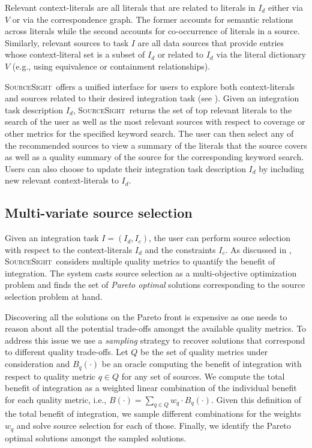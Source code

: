 \documentclass{vldb}
\newcommand\system{\textsc{SourceSight}}
\begin{document}
Relevant context-literals are all literals that are related to literals in $I_d$ either via $V$ or via the correspondence graph. The former accounts for semantic relations across literals while the second accounts for co-occurrence of literals in a source. Similarly, relevant sources to task $I$ are all data sources that provide entries whose context-literal set is a subset of $I_d$ or related to $I_d$ via the literal dictionary $V$ (e.g., using equivalence or containment relationships). 

\system~offers a unified interface for users to explore both context-literals and sources related to their desired integration task (see ). Given an integration task description $I_d$, \system~returns the set of top relevant literals to the search of the user as well as the most relevant sources with respect to coverage or other metrics for the specified keyword search. The user can then select any of the recommended sources to view a summary of the literals that the source covers as well as a quality summary of the source for the corresponding keyword search. Users can also choose to update their integration task description $I_d$ by including new relevant context-literals to $I_d$.

\subsection{Multi-variate source selection}
\label{sec:sourcesel}
Given an integration task $I = (I_d,I_c)$, the user can perform source selection with respect to the context-literals $I_d$ and the constraints $I_c$. As discussed in , \system~considers multiple quality metrics to quantify the benefit of integration. The system casts source selection as a multi-objective optimization problem and finds the set of {\em Pareto optimal} solutions corresponding to the source selection problem at hand. 

Discovering all the solutions on the Pareto front is expensive as one needs to reason about all the potential trade-offs amongst the available quality metrics. To address this issue we use a {\em sampling} strategy to recover solutions that correspond to different quality trade-offs. Let $Q$ be the set of quality metrics under consideration and $B_q(\cdot)$ be an oracle computing the benefit of integration with respect to quality metric $q \in Q$ for any set of sources. We compute the total benefit of integration as a weighted linear combination of the individual benefit for each quality metric, i.e., $B(\cdot) = \sum_{q \in Q} w_q \cdot B_q(\cdot)$. Given this definition of the total benefit of integration, we sample different combinations for the weights $w_q$ and solve source selection for each of those. Finally, we identify the Pareto optimal solutions amongst the sampled solutions. 
\end{document}
